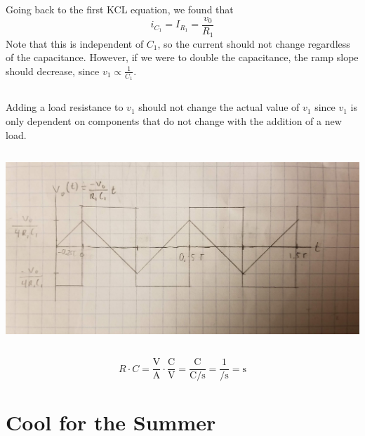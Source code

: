 \documentclass[]{article}
\begin{document}
\subsection{}

Going back to the first KCL equation, we found that 
\begin{equation}
	i_{C_1} = I_{R_1} = \frac{v_0}{R_1}
\end{equation}
Note that this is independent of \(C_1\), so the current should not change regardless of the capacitance. 
However, if we were to double the capacitance, the ramp slope should decrease, since \(v_1 \propto \frac{1}{C_1}\). 

\subsection{}

Adding a load resistance to \(v_1\) should not change the actual value of \(v_1\) since \(v_1\) is only dependent on components that do not change with the addition of a new load. 

\subsection{}

\begin{center}
	\includegraphics[width=0.7\linewidth]{20191115_195045}
\end{center}

\subsection{}

\begin{equation}
	R \cdot C = \frac{\si{\volt}}{\si{\ampere}} \cdot \frac{\si{\coulomb}}{\si{\volt}} = \frac{\si{\coulomb}}{\si{\coulomb\per\second}} = \frac{1}{\si{\per\second}} = \si{\second}
\end{equation}

\section{Cool for the Summer}
\end{document}
